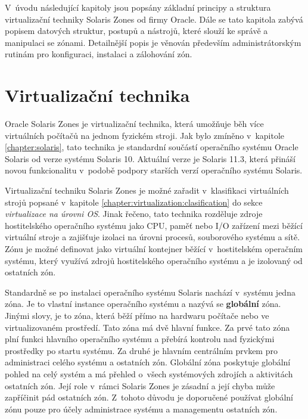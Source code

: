 \label{chapter:zones}
V~úvodu následující kapitoly jsou popsány základní principy a struktura virtualizační techniky Solaris Zones od
firmy Oracle. Dále se tato kapitola zabývá popisem datových struktur, postupů a nástrojů, které slouží ke správě a manipulaci
se zónami. Detailnější popis je věnován především administrátorským rutinám pro konfiguraci, instalaci a zálohování zón.
\section{Virtualizační technika}
\label{chapter:zones:technique}
Oracle Solaris Zones je virtualizační technika, která umožňuje běh více virtuálních počítačů na jednom fyzickém stroji. Jak
bylo zmíněno v~kapitole \ref{chapter:solaris}, tato technika je standardní součástí operačního systému Oracle Solaris od 
verze systému Solaris 10. Aktuální verze je Solaris 11.3, která přináší novou funkcionalitu v~podobě podpory starších verzí 
operačního systému Solaris.

Virtualizační techniku Solaris Zones je možné zařadit v~klasifikaci virtuálních strojů popsané v~kapitole \ref{chapter:virtualization:clasification}
do sekce \textit{virtualizace na úrovni OS}. Jinak řečeno, tato technika rozděluje zdroje hostitelského
operačního systému jako CPU, paměť nebo I/O zařízení mezi běžící virtuální stroje a zajišťuje izolaci na úrovni procesů,
souborového systému a sítě. Zónu je možné definovat jako virtuální kontejner běžící v~hostitelském operačním systému, který
využívá zdrojů hostitelského operačního systému a je izolovaný od ostatních zón.

Standardně se po instalaci operačního systému Solaris nachází v~systému jedna zóna. Je to vlastní instance operačního systému
a nazývá se \textbf{globální} zóna. Jinými slovy, je to zóna, která běží přímo na hardwaru počítače nebo ve virtualizovaném
prostředí. Tato zóna má dvě hlavní funkce. Za prvé tato zóna plní funkci hlavního operačního systému a přebírá kontrolu
nad fyzickými prostředky po startu systému. Za druhé je hlavním centrálním prvkem pro administraci celého systému a ostatních
zón. Globální zóna poskytuje globální pohled na celý systém a má přehled o~všech systémových zdrojích a aktivitách ostatních
zón. Její role v~rámci Solaris Zones je zásadní a její chyba může zapříčinit pád ostatních zón. Z~tohoto důvodu je doporučené
používat globální zónu pouze pro účely administrace systému a managementu ostatních zón.


